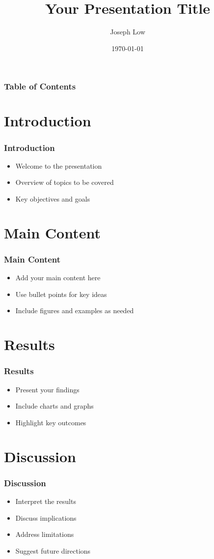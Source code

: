 \documentclass{beamer}
\title{Your Presentation Title}
\author{Joseph Low}
\date{\today}
\begin{document}
\frame{\titlepage}

\begin{frame}
\frametitle{Table of Contents}
\tableofcontents
\end{frame}

\section{Introduction}
\begin{frame}
\frametitle{Introduction}
\begin{itemize}
    \item Welcome to the presentation
    \item Overview of topics to be covered
    \item Key objectives and goals
\end{itemize}
\end{frame}

\section{Main Content}
\begin{frame}
\frametitle{Main Content}
\begin{itemize}
    \item Add your main content here
    \item Use bullet points for key ideas
    \item Include figures and examples as needed
\end{itemize}
\end{frame}

\section{Results}
\begin{frame}
\frametitle{Results}
\begin{itemize}
    \item Present your findings
    \item Include charts and graphs
    \item Highlight key outcomes
\end{itemize}
\end{frame}

\section{Discussion}
\begin{frame}
\frametitle{Discussion}
\begin{itemize}
    \item Interpret the results
    \item Discuss implications
    \item Address limitations
    \item Suggest future directions
\end{itemize}
\end{frame}
\end{document}
